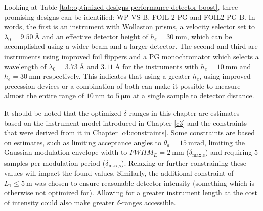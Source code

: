 Looking at Table \ref{tab:optimized-designs-performance-detector-boost}, three promising designs can be identified: WP VS B, FOIL 2 PG and FOIL2 PG B. In words, the first is an instrument with Wollaston prisms, a velocity selector set to $\lambda_0 = \SI{9.50}{\angstrom}$ and an effective detector height of $h_e = \SI{30}{\milli\meter}$, which can be accomplished using a wider beam and a larger detector. The second and third are instruments using improved foil flippers and a PG monochromator which selects a wavelength of $\lambda_0 = \SI{3.73}{\angstrom}$ and $\SI{3.11}{\angstrom}$ for the instruments with $h_e = \SI{10}{\milli\meter}$ and $h_e = \SI{30}{\milli\meter}$ respectively. This indicates that using a greater $h_e$, using improved precession devices or a combination of both can make it possible to measure almost the entire range of $\SI{10}{\nano\meter}$ to $ \SI{5}{\micro\meter}$ at a single sample to detector distance. 

It should be noted that the optimized $\delta$-ranges in this chapter are estimates based on the instrument model introduced in Chapter \ref{c3} and the constraints that were derived from it in Chapter \ref{c4:constraints}. Some constraints are based on estimates, such as limiting acceptance angles to $\theta_a = \SI{15}{\milli\radian}$, limiting the Gaussian modulation envelope width to $FWHM_E = \SI{2}{\milli\meter}$ ($\delta_{\text{max,e}}$) and requiring $5$ samples per modulation period ($\delta_{\text{max,s}}$). Relaxing or further constraining these values will impact the found values. Similarly, the additional constraint of $L_1 \leq \SI{5}{\meter}$ was chosen to ensure reasonable detector intensity (something which is otherwise not optimized for). Allowing for a greater instrument length at the cost of intensity could also make greater $\delta$-ranges accessible.

